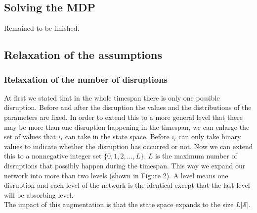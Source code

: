 \documentclass[11pt]{article}
\begin{document}
	\subsection{Solving the MDP}
	Remained to be finished.

	\subsection{Relaxation of the assumptions}
		\subsubsection{Relaxation of the number of disruptions}
			At first we stated that in the whole timespan there is only one possible disruption. Before and after the disruption the values and the distributions of the parameters are fixed. In order to extend this to a more general level that there may be more than one disruption happening in the timespan, we can enlarge the set of values that \(i_t\) can take in the state space. Before \(i_t\) can only take binary values to indicate whether the disruption has occurred or not. Now we can extend this to a nonnegative integer set \(\{0,1,2,\dots,L\}\), \(L\) is the maximum number of disruptions that possibly happen during the timespan.  This way we expand our network into more than two levels (shown in Figure 2). A level means one disruption and each level of the network is the identical except that the last level will be absorbing level.\\
			\newline The impact of this augmentation is that the state space expands to the size \(L|\mathscr{S}|\).
\end{document}
